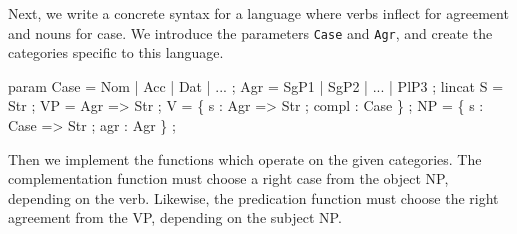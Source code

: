 \documentclass[10pt,a4paper]{article}
\newenvironment{Shaded}{\begin{snugshade}}{\end{snugshade}}
\newcommand{\DataTypeTok}[1]{\textcolor[rgb]{0.13,0.29,0.53}{{#1}}}
\newcommand{\OtherTok}[1]{\textcolor[rgb]{0.56,0.35,0.01}{{#1}}}
\newcommand{\FunctionTok}[1]{\textcolor[rgb]{0.00,0.00,0.00}{{#1}}}
\newcommand{\NormalTok}[1]{{#1}}
\begin{document}


\vspace{-1mm}

Next, we write a concrete syntax for a language where verbs inflect
for agreement and nouns for case. 
We introduce the parameters \texttt{Case} and \texttt{Agr}, and create
the categories specific to this language.

\vspace{-1mm}

\begin{Shaded}
\begin{Highlighting}[]
  \NormalTok{param}
    \DataTypeTok{Case} \FunctionTok{=} \DataTypeTok{Nom} \FunctionTok{|} \DataTypeTok{Acc} \FunctionTok{|} \DataTypeTok{Dat} \FunctionTok{|} \FunctionTok{...} \NormalTok{;}
    \DataTypeTok{Agr} \FunctionTok{=} \DataTypeTok{SgP1} \FunctionTok{|} \DataTypeTok{SgP2} \FunctionTok{|} \FunctionTok{...} \FunctionTok{|} \DataTypeTok{PlP3} \NormalTok{;}
  \NormalTok{lincat }
    \DataTypeTok{S}  \FunctionTok{=} \DataTypeTok{Str} \NormalTok{;}
    \DataTypeTok{VP} \FunctionTok{=} \DataTypeTok{Agr} \OtherTok{=>} \DataTypeTok{Str} \NormalTok{;}
    \DataTypeTok{V} \FunctionTok{=} \NormalTok{\{ s }\FunctionTok{:} \DataTypeTok{Agr} \OtherTok{=>} \DataTypeTok{Str} \NormalTok{; compl }\FunctionTok{:} \DataTypeTok{Case} \NormalTok{\} ;}
    \DataTypeTok{NP} \FunctionTok{=} \NormalTok{\{ s }\FunctionTok{:} \DataTypeTok{Case} \OtherTok{=>} \DataTypeTok{Str} \NormalTok{; agr }\FunctionTok{:} \DataTypeTok{Agr} \NormalTok{\} ;}
\end{Highlighting}
\end{Shaded}


Then we implement the functions which operate on the given categories.
The complementation function must choose a right case from the object
NP, depending on the verb. Likewise, the predication function must
choose the right agreement from the VP, depending on the subject NP.

\vspace{-1mm}
\end{document}

